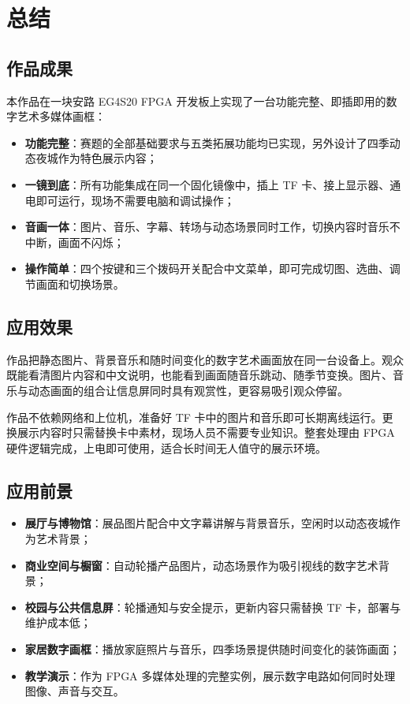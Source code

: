 \section{总结}

\subsection{作品成果}
本作品在一块安路 EG4S20 FPGA 开发板上实现了一台功能完整、即插即用的数字艺术多媒体画框：
\begin{itemize}
\item \textbf{功能完整}：赛题的全部基础要求与五类拓展功能均已实现，另外设计了四季动态夜城作为特色展示内容；
\item \textbf{一镜到底}：所有功能集成在同一个固化镜像中，插上 TF 卡、接上显示器、通电即可运行，现场不需要电脑和调试操作；
\item \textbf{音画一体}：图片、音乐、字幕、转场与动态场景同时工作，切换内容时音乐不中断，画面不闪烁；
\item \textbf{操作简单}：四个按键和三个拨码开关配合中文菜单，即可完成切图、选曲、调节画面和切换场景。
\end{itemize}

\subsection{应用效果}
作品把静态图片、背景音乐和随时间变化的数字艺术画面放在同一台设备上。观众既能看清图片内容和中文说明，也能看到画面随音乐跳动、随季节变换。图片、音乐与动态画面的组合让信息屏同时具有观赏性，更容易吸引观众停留。

作品不依赖网络和上位机，准备好 TF 卡中的图片和音乐即可长期离线运行。更换展示内容时只需替换卡中素材，现场人员不需要专业知识。整套处理由 FPGA 硬件逻辑完成，上电即可使用，适合长时间无人值守的展示环境。

\subsection{应用前景}
\begin{itemize}
\item \textbf{展厅与博物馆}：展品图片配合中文字幕讲解与背景音乐，空闲时以动态夜城作为艺术背景；
\item \textbf{商业空间与橱窗}：自动轮播产品图片，动态场景作为吸引视线的数字艺术背景；
\item \textbf{校园与公共信息屏}：轮播通知与安全提示，更新内容只需替换 TF 卡，部署与维护成本低；
\item \textbf{家居数字画框}：播放家庭照片与音乐，四季场景提供随时间变化的装饰画面；
\item \textbf{教学演示}：作为 FPGA 多媒体处理的完整实例，展示数字电路如何同时处理图像、声音与交互。
\end{itemize}

